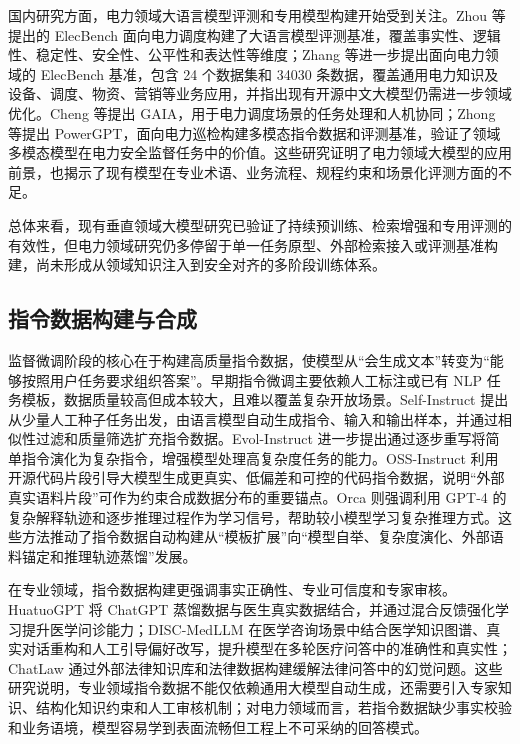\documentclass[fontset=fandol,type=master,campus=shenzhen,etitleauto=true]{hithesisbook}
\begin{document}
国内研究方面，电力领域大语言模型评测和专用模型构建开始受到关注。Zhou 等提出的 ElecBench 面向电力调度构建了大语言模型评测基准，覆盖事实性、逻辑性、稳定性、安全性、公平性和表达性等维度\cite{ref20}；Zhang 等进一步提出面向电力领域的 ElecBench 基准，包含 24 个数据集和 34030 条数据，覆盖通用电力知识及设备、调度、物资、营销等业务应用，并指出现有开源中文大模型仍需进一步领域优化\cite{ref21}。Cheng 等提出 GAIA，用于电力调度场景的任务处理和人机协同\cite{ref22}；Zhong 等提出 PowerGPT，面向电力巡检构建多模态指令数据和评测基准，验证了领域多模态模型在电力安全监督任务中的价值\cite{ref23}。这些研究证明了电力领域大模型的应用前景，也揭示了现有模型在专业术语、业务流程、规程约束和场景化评测方面的不足。

总体来看，现有垂直领域大模型研究已验证了持续预训练、检索增强和专用评测的有效性，但电力领域研究仍多停留于单一任务原型、外部检索接入或评测基准构建，尚未形成从领域知识注入到安全对齐的多阶段训练体系。

\subsection{指令数据构建与合成}

监督微调阶段的核心在于构建高质量指令数据，使模型从“会生成文本”转变为“能够按照用户任务要求组织答案”。早期指令微调主要依赖人工标注或已有 NLP 任务模板，数据质量较高但成本较大，且难以覆盖复杂开放场景。Self-Instruct 提出从少量人工种子任务出发，由语言模型自动生成指令、输入和输出样本，并通过相似性过滤和质量筛选扩充指令数据\cite{ref24}。Evol-Instruct 进一步提出通过逐步重写将简单指令演化为复杂指令，增强模型处理高复杂度任务的能力\cite{ref25}。OSS-Instruct 利用开源代码片段引导大模型生成更真实、低偏差和可控的代码指令数据，说明“外部真实语料片段”可作为约束合成数据分布的重要锚点\cite{ref26}。Orca 则强调利用 GPT-4 的复杂解释轨迹和逐步推理过程作为学习信号，帮助较小模型学习复杂推理方式\cite{ref27}。这些方法推动了指令数据自动构建从“模板扩展”向“模型自举、复杂度演化、外部语料锚定和推理轨迹蒸馏”发展。

在专业领域，指令数据构建更强调事实正确性、专业可信度和专家审核。HuatuoGPT 将 ChatGPT 蒸馏数据与医生真实数据结合，并通过混合反馈强化学习提升医学问诊能力\cite{ref28}；DISC-MedLLM 在医学咨询场景中结合医学知识图谱、真实对话重构和人工引导偏好改写，提升模型在多轮医疗问答中的准确性和真实性\cite{ref29}；ChatLaw 通过外部法律知识库和法律数据构建缓解法律问答中的幻觉问题\cite{ref13}。这些研究说明，专业领域指令数据不能仅依赖通用大模型自动生成，还需要引入专家知识、结构化知识约束和人工审核机制；对电力领域而言，若指令数据缺少事实校验和业务语境，模型容易学到表面流畅但工程上不可采纳的回答模式。
\end{document}
